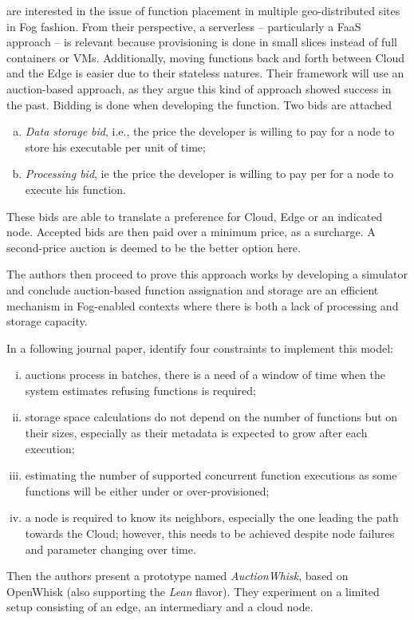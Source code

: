\begin{description}[leftmargin=10pt]
	\item[\citet{bermbach_towards_2021}] are interested in the issue of function placement in multiple geo-distributed sites in Fog fashion. From their perspective, a serverless -- particularly a \gls{FaaS} approach -- is relevant because provisioning is done in small slices instead of full containers or \glspl{VM}. Additionally, moving functions back and forth between Cloud and the Edge is easier due to their stateless natures. Their framework will use an auction-based approach, as they argue this kind of approach showed success in the past.
	Bidding is done when developing the function. Two bids are attached
	\begin{enumerate}[(a)]
		\item \emph{Data storage bid}, i.e., the price the developer is willing to pay for a node to store his executable per unit of time;
		\item \emph{Processing bid}, ie the price the developer is willing to pay per for a node to execute his function.
	\end{enumerate}
	These bids are able to translate a preference for Cloud, Edge or an indicated node. Accepted bids are then paid over a minimum price, as a surcharge. A second-price auction is deemed to be the better option here.
	
	The authors then proceed to prove this approach works by developing a simulator and conclude auction-based function assignation and storage are an efficient mechanism in Fog-enabled contexts where there is both a lack of processing and storage capacity.
	
	In a following journal paper, \citet{bermbach_auctionwhisk_2021} identify four constraints to implement this model:
	\begin{enumerate}[(i)]
		\item auctions process in batches, there is a need of a window of time when the system estimates refusing functions is required;
		\item storage space calculations do not depend on the number of functions but on their sizes, especially as their metadata is expected to grow after each execution;
		\item estimating the number of supported concurrent function executions as some functions will be either under or over-provisioned;
		\item a node is required to know its neighbors, especially the one leading the path towards the Cloud; however, this needs to be achieved despite node failures and parameter changing over time.
	\end{enumerate}
	
	Then the authors present a prototype named \emph{AuctionWhisk}, based on OpenWhisk (also supporting the \emph{Lean} flavor). They experiment on a limited setup consisting of an edge, an intermediary and a cloud node.
	
\end{description}

